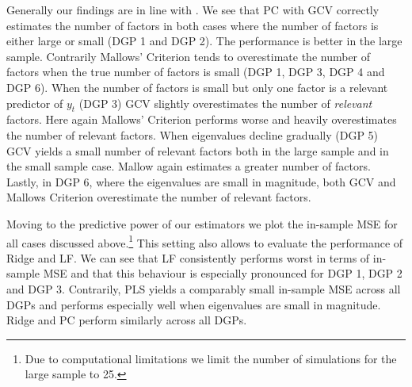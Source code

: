 Generally our findings are in line with \citeauthor{carrasco2016sample}. We see that PC with GCV correctly estimates the number of factors  in both cases where the number of factors is either large or small (DGP 1 and DGP 2). The performance is better in the large sample. Contrarily Mallows' Criterion tends to overestimate the number of factors when the true number of factors is small (DGP 1, DGP 3, DGP 4 and DGP 6). When the number of factors is small but only one factor is a relevant predictor of $y_t$ (DGP 3) GCV slightly overestimates the number of \textit{relevant} factors. Here again Mallows' Criterion performs worse and heavily overestimates the number of relevant factors. When eigenvalues decline gradually (DGP 5) GCV yields a small number of relevant factors both in the large sample and in the small sample case. Mallow again estimates a greater number of factors. Lastly, in DGP 6, where the eigenvalues are small in magnitude, both GCV and Mallows Criterion overestimate the number of relevant factors. 




Moving to the predictive power of our estimators we plot the in-sample MSE for all cases discussed above.\footnote{Due to computational limitations we limit the number of simulations for the large sample to 25.} This setting also allows to evaluate the performance of Ridge and LF. We can see that LF consistently performs worst in terms of in-sample MSE and that this behaviour is especially pronounced for DGP 1, DGP 2 and DGP 3. Contrarily, PLS yields a comparably small in-sample MSE across all DGPs and performs especially well when eigenvalues are small in magnitude. Ridge and PC perform similarly across all DGPs. 


